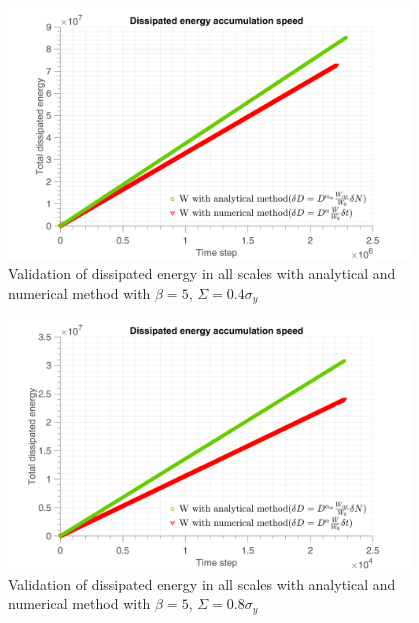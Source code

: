 \documentclass[3p,times,procedia,number]{elsarticle}
\begin{document}
\begin{figure}[!h]
	\centering
	\includegraphics[width=0.95\textwidth]{figures//W3methods_bigbeta_04y.png} 
	\caption{Validation of dissipated energy in all scales with analytical and numerical method with $\beta=5$, $\Sigma=0.4\sigma_y$ }
	\label{fig.W3methods_bigbeta_04y}
\end{figure}
\begin{figure}[!h]
	\centering
	\includegraphics[width=0.95\textwidth]{figures//W3methods_bigbeta_08y.png} 
	\caption{Validation of dissipated energy in all scales with analytical and numerical method with $\beta=5$, $\Sigma=0.8\sigma_y$ }
	\label{fig.W3methods_bigbeta_08y}
\end{figure}
\end{document}
